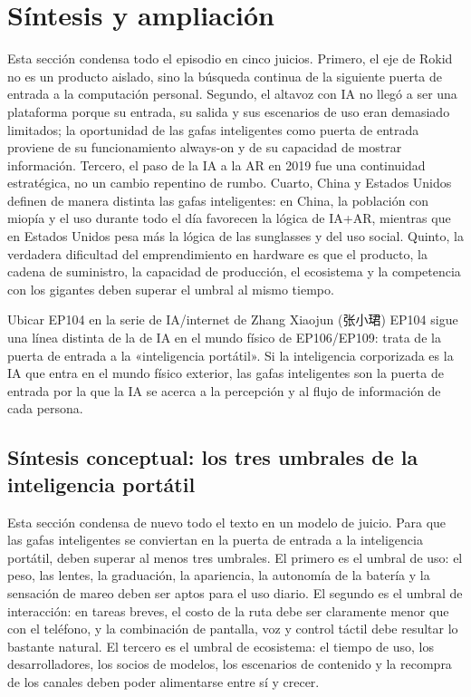 \documentclass[a4paper]{article}
\begin{document}
\section{Síntesis y ampliación}

Esta sección condensa todo el episodio en cinco juicios. Primero, el eje de Rokid no es un producto aislado, sino la búsqueda continua de la siguiente puerta de entrada a la computación personal. Segundo, el altavoz con IA no llegó a ser una plataforma porque su entrada, su salida y sus escenarios de uso eran demasiado limitados; la oportunidad de las gafas inteligentes como puerta de entrada proviene de su funcionamiento always-on y de su capacidad de mostrar información. Tercero, el paso de la IA a la AR en 2019 fue una continuidad estratégica, no un cambio repentino de rumbo. Cuarto, China y Estados Unidos definen de manera distinta las gafas inteligentes: en China, la población con miopía y el uso durante todo el día favorecen la lógica de IA+AR, mientras que en Estados Unidos pesa más la lógica de las sunglasses y del uso social. Quinto, la verdadera dificultad del emprendimiento en hardware es que el producto, la cadena de suministro, la capacidad de producción, el ecosistema y la competencia con los gigantes deben superar el umbral al mismo tiempo.

\begin{importantbox}{Ubicar EP104 en la serie de IA/internet de Zhang Xiaojun (张小珺)}
EP104 sigue una línea distinta de la de IA en el mundo físico de EP106/EP109: trata de la puerta de entrada a la «inteligencia portátil». Si la inteligencia corporizada es la IA que entra en el mundo físico exterior, las gafas inteligentes son la puerta de entrada por la que la IA se acerca a la percepción y al flujo de información de cada persona.
\end{importantbox}

\subsection{Síntesis conceptual: los tres umbrales de la inteligencia portátil}

Esta sección condensa de nuevo todo el texto en un modelo de juicio. Para que las gafas inteligentes se conviertan en la puerta de entrada a la inteligencia portátil, deben superar al menos tres umbrales. El primero es el umbral de uso: el peso, las lentes, la graduación, la apariencia, la autonomía de la batería y la sensación de mareo deben ser aptos para el uso diario. El segundo es el umbral de interacción: en tareas breves, el costo de la ruta debe ser claramente menor que con el teléfono, y la combinación de pantalla, voz y control táctil debe resultar lo bastante natural. El tercero es el umbral de ecosistema: el tiempo de uso, los desarrolladores, los socios de modelos, los escenarios de contenido y la recompra de los canales deben poder alimentarse entre sí y crecer.
\end{document}
